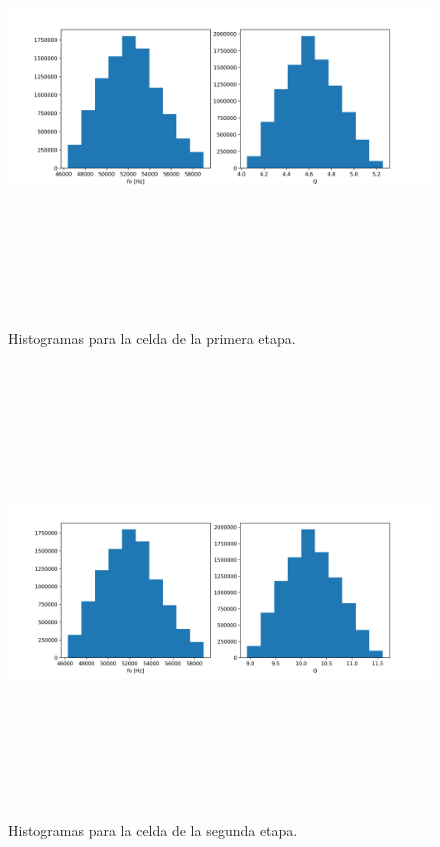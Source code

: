  \begin{figure}[H] %
	\centering	\includegraphics[width=12cm,height=12cm,keepaspectratio]{../EJ4/graficos/histo_c1.png}
	\caption{Histogramas para la celda de la primera etapa.}
	\label{histo_c1}
\end{figure}

 \begin{figure}[H] %
	\centering	\includegraphics[width=12cm,height=12cm,keepaspectratio]{../EJ4/graficos/histo_c2.png}
	\caption{Histogramas para la celda de la segunda etapa.}
	\label{histo_c2}
\end{figure}

